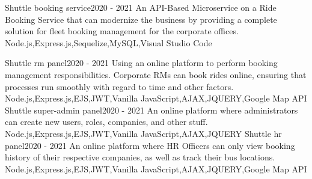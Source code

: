 
\begin{projects}
	\project
	{Shuttle booking service}{2020 - 2021}
	{}
	{An API-Based Microservice on a Ride Booking Service that can modernize the business by providing a complete solution for fleet booking management for the corporate offices.}
	{Node.js,Express.js,Sequelize,MySQL,Visual Studio Code}
				
	\project
	{Shuttle rm panel}{2020 - 2021}
	{{} }
	{Using an online platform to perform booking management responsibilities. Corporate RMs can book rides online, ensuring that processes run smoothly with regard to time and other factors.}
	{Node.js,Express.js,EJS,JWT,Vanilla JavaScript,AJAX,JQUERY,Google Map API}
	\project
	{Shuttle super-admin panel}{2020 - 2021}
	{{} }
	{An online platform where administrators can create new users, roles, companies, and other stuff.}
	{Node.js,Express.js,EJS,JWT,Vanilla JavaScript,AJAX,JQUERY}
	\project
	{Shuttle hr panel}{2020 - 2021}
	{{} }
	{An online platform where HR Officers can only view  booking history of their respective companies, as well as track their bus locations.}
	{Node.js,Express.js,EJS,JWT,Vanilla JavaScript,AJAX,JQUERY,Google Map API}
    \newpage
\end{projects}